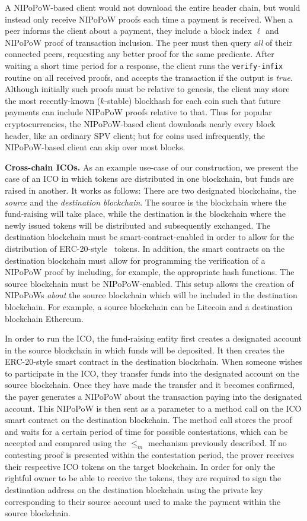 A NIPoPoW-based client would not download the entire header chain, but would
instead only receive NIPoPoW proofs each time a payment is received. When a peer
informs the client about a payment, they include a block index $\ell$ and
NIPoPoW proof of transaction inclusion. The peer must then query \emph{all} of
their connected peers, requesting any better proof for the same predicate. After
waiting a short time period for a response, the client runs the
\texttt{verify-infix} routine on all received proofs, and accepts the
transaction if the output is \emph{true}. Although initially such proofs must be
relative to genesis, the client may store the most recently-known ($k$-stable)
blockhash for each coin such that future payments can include NIPoPoW proofs
relative to that. Thus for popular cryptocurrencies, the NIPoPoW-based client
downloads nearly every block header, like an ordinary SPV client; but for
coins used infrequently, the NIPoPoW-based client can skip over most blocks.

\noindent
\textbf{Cross-chain ICOs.}
As an example use-case of our construction, we present the case of an
ICO in which tokens are distributed in one blockchain,
but funds are raised in another. It works as follows:
There are two designated blockchains, the \emph{source} and
the \emph{destination blockchain}. The source is the blockchain
where the fund-raising will take place, while the destination is the
blockchain where the newly issued tokens will be distributed and subsequently
exchanged. The destination blockchain must be smart-contract-enabled in order to
allow for the distribution of ERC-20-style~\cite{erc20} tokens.
In addition, the smart contracts on the destination blockchain must allow for
programming the verification of a NIPoPoW proof by including, for example, the
appropriate hash functions. The source blockchain must be NIPoPoW-enabled. This
setup allows the creation of NIPoPoWs \emph{about} the source blockchain which
will be included in the destination blockchain. For example, a source blockchain
can be Litecoin and a destination blockchain Ethereum.

In order to run the ICO, the fund-raising entity first creates a designated
account in the source blockchain in which funds will be deposited. It then
creates the ERC-20-style smart contract in the destination blockchain. When
someone wishes to participate in the ICO, they transfer funds into the
designated account on the source blockchain. Once they have made the transfer
and it becomes confirmed, the payer generates a NIPoPoW about the transaction
paying into the designated account. This NIPoPoW is then sent as a parameter to
a method call on the ICO smart contract on the destination blockchain. The
method call stores the proof and waits for a certain period of time for possible
contestations, which can be accepted and compared using the $\leq_m$ mechanism
previously described. If no contesting proof is presented within the
contestation period, the prover receives their respective ICO tokens on the
target blockchain. In order for only the rightful owner to be able to receive
the tokens, they are required to sign the destination address on the destination
blockchain using the private key corresponding to their source account used to
make the payment within the source blockchain.

